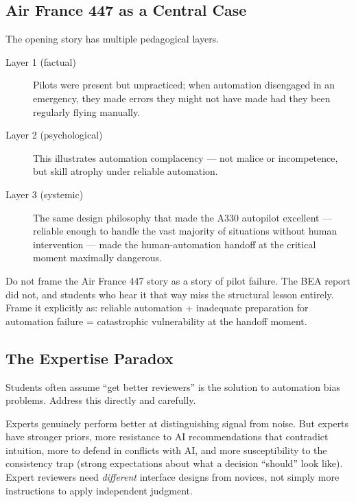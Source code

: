 \subsection{Air France 447 as a Central Case}

The opening story has multiple pedagogical layers.

\begin{description}
    \item[Layer 1 (factual)] Pilots were present but unpracticed; when automation disengaged in an emergency, they made errors they might not have made had they been regularly flying manually.
    \item[Layer 2 (psychological)] This illustrates automation complacency --- not malice or incompetence, but skill atrophy under reliable automation.
    \item[Layer 3 (systemic)] The same design philosophy that made the A330 autopilot excellent --- reliable enough to handle the vast majority of situations without human intervention --- made the human-automation handoff at the critical moment maximally dangerous.
\end{description}

\begin{cautionbox}
Do not frame the Air France 447 story as a story of pilot failure. The BEA report did not, and students who hear it that way miss the structural lesson entirely. Frame it explicitly as: reliable automation + inadequate preparation for automation failure = catastrophic vulnerability at the handoff moment.
\end{cautionbox}

\subsection{The Expertise Paradox}

Students often assume ``get better reviewers'' is the solution to automation bias problems. Address this directly and carefully.

\begin{keyconcept}
Experts genuinely perform better at distinguishing signal from noise. But experts have stronger priors, more resistance to AI recommendations that contradict intuition, more to defend in conflicts with AI, and more susceptibility to the consistency trap (strong expectations about what a decision ``should'' look like). Expert reviewers need \emph{different} interface designs from novices, not simply more instructions to apply independent judgment.
\end{keyconcept}

